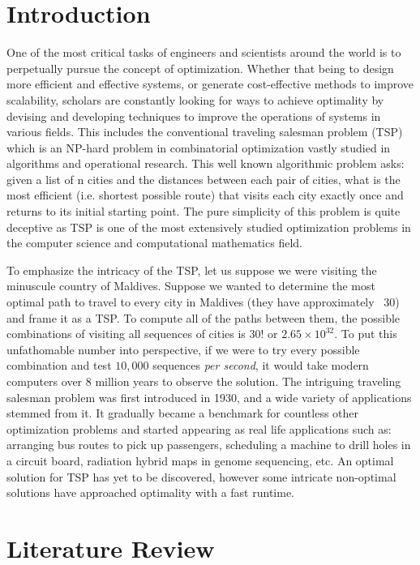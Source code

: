 \documentclass{article}
\begin{document}
\section{Introduction}
One of the most critical tasks of engineers and scientists around the world is to perpetually pursue the concept of optimization. Whether that being to design more efficient and effective systems, or generate cost-effective methods to improve scalability, scholars are constantly looking for ways to achieve optimality by devising and developing techniques to improve the operations of systems in various fields. This includes the conventional traveling salesman problem (TSP) which is an NP-hard problem in combinatorial optimization vastly studied in algorithms and operational research. This well known algorithmic problem asks: given a list of n cities and the distances between each pair of cities, what is the most efficient (i.e. shortest possible route) that visits each city exactly once and returns to its initial starting point. The pure simplicity of this problem is quite deceptive as TSP is one of the most extensively studied optimization problems in the computer science and computational mathematics field. \\
\par To emphasize the intricacy of the TSP, let us suppose we were visiting the minuscule country of Maldives. Suppose we wanted to determine the most optimal path to travel to every city in Maldives (they have approximately ~30) and frame it as a TSP. To compute all of the paths between them, the possible combinations of visiting all sequences of cities is 30! or $2.65 \times 10^{32}$. To put this unfathomable number into perspective, if we were to try every possible combination and test $10,000$ sequences \textit{per second}, it would take modern computers over 8 million years to observe the solution. The intriguing traveling salesman problem was first introduced in 1930, and a wide variety of applications stemmed from it. It gradually became a benchmark for countless other optimization problems and started appearing as real life applications such as: arranging bus routes to pick up passengers, scheduling a machine to drill holes in a circuit board, radiation hybrid maps in genome sequencing, etc. An optimal solution for TSP has yet to be discovered, however some intricate non-optimal solutions have approached optimality with a fast runtime.


\section{Literature Review}
\end{document}
